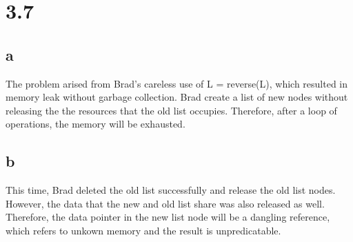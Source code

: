 \documentclass[a4paper, 11pt]{article}
\begin{document}
\pagebreak

\section{3.7}

\subsection{a}
The problem arised from Brad's careless use of L = reverse(L), which resulted in
memory leak without garbage collection. Brad create a list of new nodes without
releasing the the resources that the old list occupies. Therefore, after a loop
of operations, the memory will be exhausted.

\subsection{b}

This time, Brad deleted the old list successfully and release the old
list nodes. However, the data that the new and old list share was also released
as well. Therefore, the data pointer in the new list node will be a dangling
reference, which refers to unkown memory and the result is unpredicatable.
\end{document}
